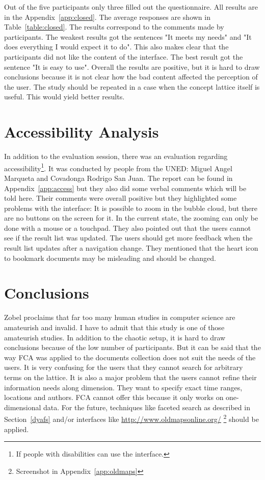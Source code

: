 \documentclass[11pt]{report}
\begin{document}
Out of the five participants only three filled out the questionnaire. All results are in the Appendix~\ref{app:closed}. The average responses are shown in Table~\ref{table:closed}. The results correspond to the comments made by participants. The weakest results got the sentences "It meets my needs" and "It does everything I would expect it to do". This also makes clear that the participants did not like the content of the interface. The best result got the sentence "It is easy to use". Overall the results are positive, but it is hard to draw conclusions because it is not clear how the bad content affected the perception of the user. The study should be repeated in a case when the concept lattice itself is useful. This would yield better results.

\section{Accessibility Analysis}

In addition to the evaluation session, there was an evaluation regarding accessibility\footnote{If people with disabilities can use the interface.}. It was conducted by people from the UNED: Miguel Angel Marqueta and Covadonga Rodrigo San Juan. The report can be found in Appendix~\ref{app:access} but they also did some verbal comments which will be told here. Their comments were overall positive but they highlighted some problems with the interface: It is possible to zoom in the bubble cloud, but there are no buttons on the screen for it. In the current state, the zooming can only be done with a mouse or a touchpad. They also pointed out that the users cannot see if the result list was updated. The users should get more feedback when the result list updates after a navigation change. They mentioned that the heart icon to bookmark documents may be misleading and should be changed. 

\section{Conclusions} 
Zobel \cite{Zobel2004} proclaims that far too many human studies in computer science are amateurish and invalid. I have to admit that this study is one of those amateurish studies. In addition to the chaotic setup, it is hard to draw conclusions because of the low number of participants. But it can be said that the way FCA was applied to the documents collection does not suit the needs of the users. It is very confusing for the users that they cannot search for arbitrary terms on the lattice. It is also a major problem that the users cannot refine their information needs along dimension. They want to specify exact time ranges, locations and authors. FCA cannot offer this because it only works on one-dimensional data. For the future, techniques like faceted search as described in Section~\ref{dyafs} and/or interfaces like \url{http://www.oldmapsonline.org/} \footnote{Screenshot in Appendix~\ref{app:oldmaps}} should be applied.\\
 
\end{document}
